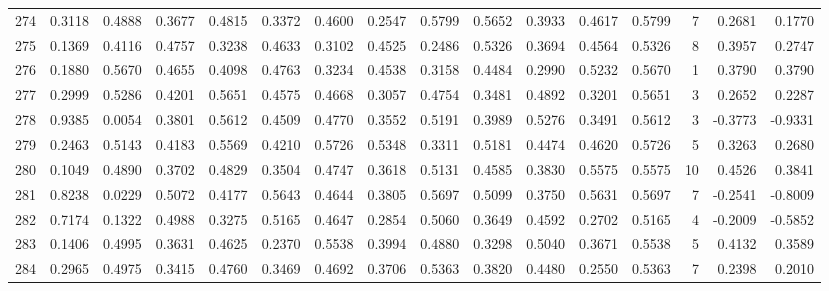 \begin{tabular}{lrrrrrrrrrrrrrrr}
274 &      0.3118 &  0.4888 &  0.3677 &  0.4815 &  0.3372 &  0.4600 &  0.2547 &  0.5799 &  0.5652 &  0.3933 &   0.4617 &     0.5799 &      7 &                    0.2681 &                     0.1770 \\
275 &      0.1369 &  0.4116 &  0.4757 &  0.3238 &  0.4633 &  0.3102 &  0.4525 &  0.2486 &  0.5326 &  0.3694 &   0.4564 &     0.5326 &      8 &                    0.3957 &                     0.2747 \\
276 &      0.1880 &  0.5670 &  0.4655 &  0.4098 &  0.4763 &  0.3234 &  0.4538 &  0.3158 &  0.4484 &  0.2990 &   0.5232 &     0.5670 &      1 &                    0.3790 &                     0.3790 \\
277 &      0.2999 &  0.5286 &  0.4201 &  0.5651 &  0.4575 &  0.4668 &  0.3057 &  0.4754 &  0.3481 &  0.4892 &   0.3201 &     0.5651 &      3 &                    0.2652 &                     0.2287 \\
278 &      0.9385 &  0.0054 &  0.3801 &  0.5612 &  0.4509 &  0.4770 &  0.3552 &  0.5191 &  0.3989 &  0.5276 &   0.3491 &     0.5612 &      3 &                   -0.3773 &                    -0.9331 \\
279 &      0.2463 &  0.5143 &  0.4183 &  0.5569 &  0.4210 &  0.5726 &  0.5348 &  0.3311 &  0.5181 &  0.4474 &   0.4620 &     0.5726 &      5 &                    0.3263 &                     0.2680 \\
280 &      0.1049 &  0.4890 &  0.3702 &  0.4829 &  0.3504 &  0.4747 &  0.3618 &  0.5131 &  0.4585 &  0.3830 &   0.5575 &     0.5575 &     10 &                    0.4526 &                     0.3841 \\
281 &      0.8238 &  0.0229 &  0.5072 &  0.4177 &  0.5643 &  0.4644 &  0.3805 &  0.5697 &  0.5099 &  0.3750 &   0.5631 &     0.5697 &      7 &                   -0.2541 &                    -0.8009 \\
282 &      0.7174 &  0.1322 &  0.4988 &  0.3275 &  0.5165 &  0.4647 &  0.2854 &  0.5060 &  0.3649 &  0.4592 &   0.2702 &     0.5165 &      4 &                   -0.2009 &                    -0.5852 \\
283 &      0.1406 &  0.4995 &  0.3631 &  0.4625 &  0.2370 &  0.5538 &  0.3994 &  0.4880 &  0.3298 &  0.5040 &   0.3671 &     0.5538 &      5 &                    0.4132 &                     0.3589 \\
284 &      0.2965 &  0.4975 &  0.3415 &  0.4760 &  0.3469 &  0.4692 &  0.3706 &  0.5363 &  0.3820 &  0.4480 &   0.2550 &     0.5363 &      7 &                    0.2398 &                     0.2010 \\

\end{tabular}
